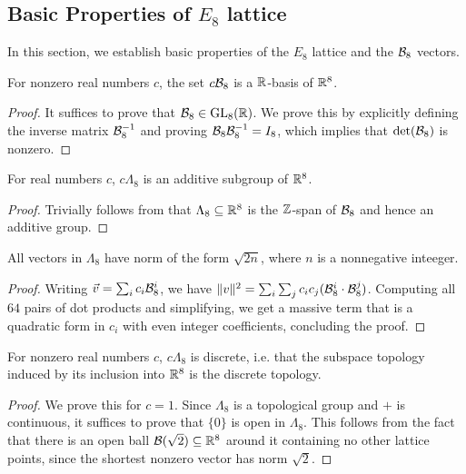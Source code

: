 \subsection{Basic Properties of $E_8$ lattice}

In this section, we establish basic properties of the $E_8$ lattice and the $\mathcal{B}_8$ vectors.

\begin{lemma}\label{E8_Scaled_is_basis}\leanok
  For nonzero real numbers $c$, the set $c\mathcal{B}_8$ is a $\mathbb{R}$-basis of $\mathbb{R}^8$.
\end{lemma}
\begin{proof}
  It suffices to prove that $\mathcal{B}_8 \in \mathrm{GL}_8(\mathbb{R})$. We prove this by explicitly defining the inverse matrix $\mathcal{B}_8^{-1}$ and proving $\mathcal{B}_8 \mathcal{B}_8^{-1} = I_8$, which implies that $\det(\mathcal{B}_8)$ is nonzero.
\end{proof}

\begin{lemma}\label{E8_Scaled_Lattice}\leanok
  For real numbers $c$, $c\Lambda_8$ is an additive subgroup of $\mathbb{R}^8$.
\end{lemma}
\begin{proof}\leanok
  Trivially follows from that $\Lambda_8 \subseteq \mathbb{R}^8$ is the $\mathbb{Z}$-span of $\mathcal{B}_8$ and hence an additive group.
\end{proof}

\begin{lemma}\label{E8_Shortest_Vector}\leanok
  All vectors in $\Lambda_8$ have norm of the form $\sqrt{2n}$, where $n$ is a nonnegative inteeger.
\end{lemma}
\begin{proof}
  Writing $\vec{v} = \sum_i c_i\mathcal{B}_8^i$, we have $\|v\|^2 = \sum_i \sum_j c_ic_j (\mathcal{B}_8^i \cdot \mathcal{B}_8^j)$. Computing all $64$ pairs of dot products and simplifying, we get a massive term that is a quadratic form in $c_i$ with even integer coefficients, concluding the proof.
\end{proof}

\begin{lemma}\label{instDiscreteE8ScaledLattice}\leanok
  For nonzero real numbers $c$, $c\Lambda_8$ is discrete, i.e. that the subspace topology induced by its inclusion into $\mathbb{R}^8$ is the discrete topology.
\end{lemma}
\begin{proof}
  We prove this for $c = 1$. Since $\Lambda_8$ is a topological group and $+$ is continuous, it suffices to prove that $\{0\}$ is open in $\Lambda_8$. This follows from the fact that there is an open ball $\mathcal{B}(\sqrt{2}) \subseteq \mathbb{R}^8$ around it containing no other lattice points, since the shortest nonzero vector has norm $\sqrt{2}$.
\end{proof}

